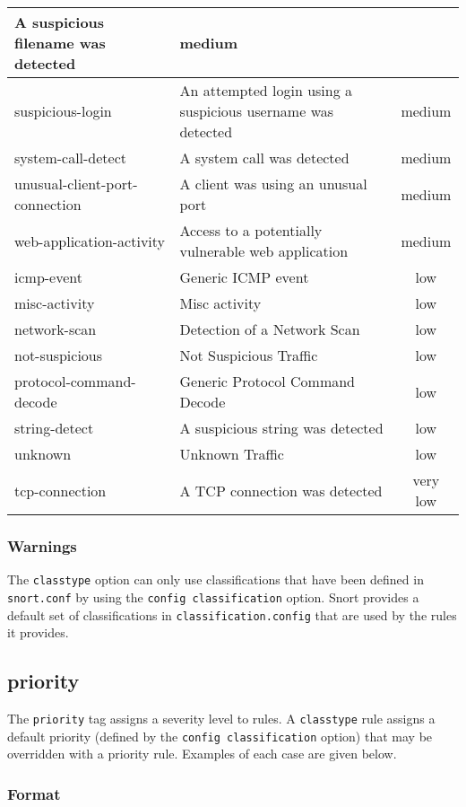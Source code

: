 \documentclass[english]{report}
\begin{document}
\begin{center}
\begin{longtable}[h]{|p{2in}|p{2.5in}|c|}
A suspicious filename was detected & medium\\
\hline 
suspicious-login&
An attempted login using a suspicious username was detected & medium\\
\hline 
system-call-detect&
A system call was detected & medium\\
\hline 
unusual-client-port-connection&
A client was using an unusual port & medium\\
\hline 
web-application-activity&
Access to a potentially vulnerable web application & medium\\
\hline
icmp-event&
Generic ICMP event & low\\
\hline 
misc-activity&
Misc activity & low\\
\hline 
network-scan&
Detection of a Network Scan & low\\
\hline 
not-suspicious&
Not Suspicious Traffic & low\\
\hline 
protocol-command-decode&
Generic Protocol Command Decode & low\\
\hline 
string-detect&
A suspicious string was detected & low\\
\hline 
unknown&
Unknown Traffic & low\\
\hline
tcp-connection&
A TCP connection was detected & very low\\
\hline
\end{longtable}
\end{center}

\subsubsection{Warnings}

The \texttt{classtype} option can only use classifications that have been
defined in \texttt{snort.conf} by using the \texttt{config classification}
option.  Snort provides a default set of classifications in
\texttt{classification.config} that are used by the rules it provides.

\subsection{priority}

The \texttt{priority} tag assigns a severity level to rules. A
\texttt{classtype} rule assigns a default priority (defined by the
\texttt{config classification} option) that may be overridden with a priority
rule.  Examples of each case are given below.

\subsubsection{Format}
\end{document}
